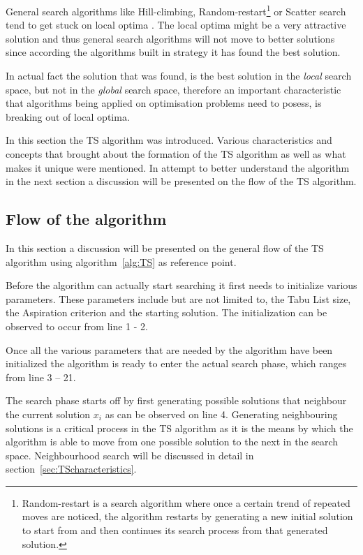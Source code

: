 General search algorithms like Hill-climbing, Random-restart\footnote{Random-restart is a search algorithm where once a certain trend of repeated moves are noticed, the algorithm restarts by generating a new initial solution to start from and then continues its search process from that generated solution\cite{AIModernApproach}.} or Scatter search tend to get stuck on local optima \cite{AIModernApproach}. The local optima might be a very attractive solution and thus general search algorithms will not move to better solutions since according the algorithms built in strategy it has found the best solution. 

In actual fact the solution that was found, is the best solution in the \emph{local} search space, but not in the \emph{global} search space\cite{CompuIntelligenceIntro,AIModernApproach}, therefore an important characteristic that algorithms being applied on optimisation problems need to posess, is breaking out of local optima\cite{CompuIntelligenceIntro,AIModernApproach}.

In this section the TS algorithm was introduced. Various characteristics and concepts that brought about the formation of the TS algorithm as well as what makes it unique were mentioned. In attempt to better understand the algorithm in the next section a discussion will be presented on the flow of the TS algorithm.
\subsection{Flow of the algorithm}
In this section a discussion will be presented on the general flow of the TS algorithm using algorithm~\ref{alg:TS} as reference point.

Before the algorithm can actually start searching it first needs to initialize various parameters. These parameters include but are not limited to, the Tabu List size, the Aspiration criterion and the starting solution. The initialization can be observed to occur from line 1 - 2.

Once all the various parameters that are needed by the algorithm have been initialized the algorithm is ready to enter the actual search phase, which ranges from line 3 -- 21. 

The search phase starts off by first generating possible solutions that neighbour the current solution $x_i$ as can be observed on line 4. Generating neighbouring solutions is a critical process in the TS algorithm as it is the means by which the algorithm is able to move from one possible solution to the next in the search space. Neighbourhood search will be discussed in detail in section~\ref{sec:TScharacteristics}.

